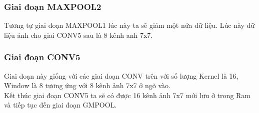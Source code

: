 \subsubsection{Giai đoạn MAXPOOL2}
Tương tự giai đoạn MAXPOOL1 lúc này ta sẽ giảm một nửa dữ liệu. Lúc này dữ liệu ảnh cho giai CONV5 sau là 8 kênh anh 7x7.

\subsubsection{Giai đoạn CONV5}
Giai đoạn này giống với các giai đoạn CONV trên với số lượng Kernel là 16, Window là 8 tương ứng với 8 kênh ảnh 7x7 ở ngõ vào.\\
Kết thúc giai đoạn CONV5 ta sẽ có được 16 kênh ảnh 7x7 mới lưu ở trong Ram và tiếp tục đến giai đoạn GMPOOL.

